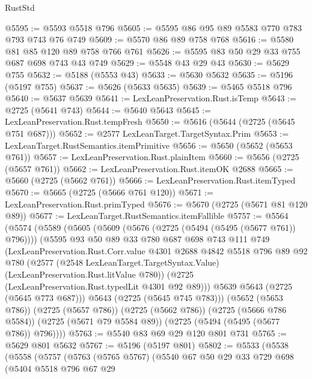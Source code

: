 \begin{lexlean}{RustStd}
\begin{coremodule}
@5595 := @5593 @5518 @796
@5605 := @5595 @86 @95 @89 @5583 @770 @783 @793 @743 @76 @749
@5609 := @5570 @86 @89 @758 @768
@5616 := @5580 @81 @85 @120 @89 @758 @766 @761
@5626 := @5595 @83 @50 @29 @33 @755 @687 @698 @743 @43 @749
@5629 := @5548 @43 @29 @43
@5630 := @5629 @755
@5632 := @5188 (@5553 @43)
@5633 := @5630 @5632
@5635 := @5196 (@5197 @755)
@5637 := @5626 (@5633 @5635)
@5639 := @5465 @5518 @796
@5640 := @5637 @5639
@5641 := LexLeanPreservation.Rust.isTemp
@5643 := @2725 (@5641 @743)
@5644 := @5640 @5643
@5645 := LexLeanPreservation.Rust.tempFresh
@5650 := @5616 (@5644 (@2725 (@5645 @751 @687)))
@5652 := @2577 LexLeanTarget.TargetSyntax.Prim
@5653 := LexLeanTarget.RustSemantics.itemPrimitive
@5656 := @5650 (@5652 (@5653 @761))
@5657 := LexLeanPreservation.Rust.plainItem
@5660 := @5656 (@2725 (@5657 @761))
@5662 := LexLeanPreservation.Rust.itemOK @2688
@5665 := @5660 (@2725 (@5662 @761))
@5666 := LexLeanPreservation.Rust.itemTyped
@5670 := @5665 (@2725 (@5666 @761 @120))
@5671 := LexLeanPreservation.Rust.primTyped
@5676 := @5670 (@2725 (@5671 @81 @120 @89))
@5677 := LexLeanTarget.RustSemantics.itemFallible
@5757 := @5564
    (@5574
      (@5589
        (@5605
          (@5609 (@5676 (@2725 (@5494 (@5495 (@5677 @761)) @796))))
          (@5595
            @93
            @50
            @89
            @33
            @780
            @687
            @698
            @743
            @111
            @749
            (LexLeanPreservation.Rust.Corr.value
              @4301
              @2688
              @4842
              @5518
              @796
              @89
              @92
              @780
              (@2577
                (@2548 LexLeanTarget.TargetSyntax.Value)
                (LexLeanPreservation.Rust.litValue @780))
              (@2725 (LexLeanPreservation.Rust.typedLit @4301 @92 @89)))
            @5639
            @5643
            (@2725 (@5645 @773 @687)))
          @5643
          (@2725 (@5645 @745 @783)))
        (@5652 (@5653 @786))
        (@2725 (@5657 @786))
        (@2725 (@5662 @786))
        (@2725 (@5666 @786 @5584))
        (@2725 (@5671 @79 @5584 @89))
        (@2725 (@5494 (@5495 (@5677 @786)) @796))))
@5763 := @5540 @83 @69 @29 @120 @801 @731
@5765 := @5629 @801 @5632
@5767 := @5196 (@5197 @801)
@5802 := @5533
    (@5538
      (@5558
        (@5757
          (@5763
            (@5765 @5767)
            (@5540
              @67
              @50
              @29
              @33
              @729
              @698
              (@5404
                @5518
                @796
                @67
                @29

\end{coremodule}
\end{lexlean}
